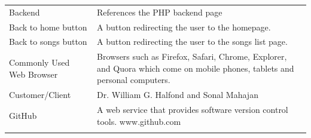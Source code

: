 \documentclass[]{article}
\begin{document}
\begin{longtable}[c]{@{}ll@{}}
\\\addlinespace
\begin{minipage}[t]{0.47\columnwidth}\raggedright
Backend
\end{minipage} & \begin{minipage}[t]{0.47\columnwidth}\raggedright
References the PHP backend page
\end{minipage}
\\\addlinespace
\begin{minipage}[t]{0.47\columnwidth}\raggedright
Back to home button
\end{minipage} & \begin{minipage}[t]{0.47\columnwidth}\raggedright
A button redirecting the user to the homepage.
\end{minipage}
\\\addlinespace
\begin{minipage}[t]{0.47\columnwidth}\raggedright
Back to songs button
\end{minipage} & \begin{minipage}[t]{0.47\columnwidth}\raggedright
A button redirecting the user to the songs list page.
\end{minipage}
\\\addlinespace
\begin{minipage}[t]{0.47\columnwidth}\raggedright
Commonly Used Web Browser
\end{minipage} & \begin{minipage}[t]{0.47\columnwidth}\raggedright
Browsers such as Firefox, Safari, Chrome, Explorer, and Quora which come
on mobile phones, tablets and personal computers.
\end{minipage}
\\\addlinespace
\begin{minipage}[t]{0.47\columnwidth}\raggedright
Customer/Client
\end{minipage} & \begin{minipage}[t]{0.47\columnwidth}\raggedright
Dr. William G. Halfond and Sonal Mahajan
\end{minipage}
\\\addlinespace
\begin{minipage}[t]{0.47\columnwidth}\raggedright
GitHub
\end{minipage} & \begin{minipage}[t]{0.47\columnwidth}\raggedright
A web service that provides software version control tools.
www.github.com
\end{minipage}
\\\addlinespace

\end{longtable}
\end{document}

